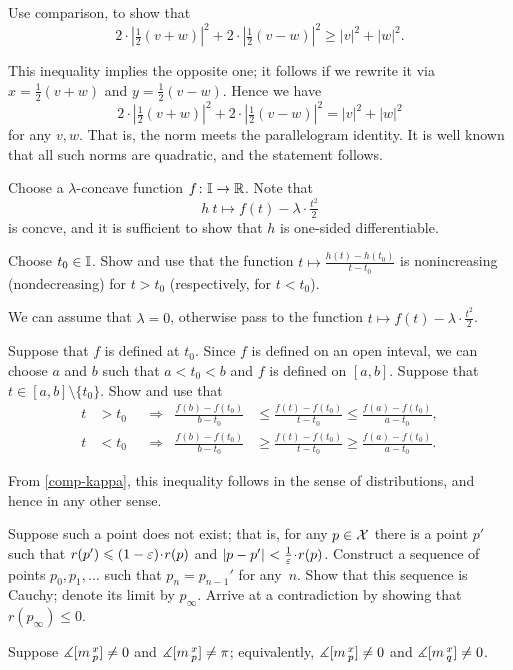 Use comparison, to show that
\[2\cdot |\tfrac12(v+w)|^2+2\cdot |\tfrac12(v-w)|^2\ge |v|^2+|w|^2.\]

This inequality implies the opposite one;
it follows if we rewrite it via $x=\tfrac12(v+w)$ and $y=\tfrac12(v-w)$.
Hence we have 
\[2\cdot |\tfrac12(v+w)|^2+2\cdot |\tfrac12(v-w)|^2= |v|^2+|w|^2\]
for any $v,w$.
That is, the norm meets the parallelogram identity.
It is well known that all such norms are quadratic, and the statement follows.

Choose a $\lambda$-concave function $f\colon\mathbb{I}\to\mathbb{R}$.
Note that
\[h\:t\mapsto f(t)-\lambda\cdot\tfrac{t^2}2\]
is concve,
and it is sufficient to show that $h$ is one-sided differentiable.

Choose $t_0\in \mathbb{I}$.
Show and use that the function
$t\mapsto \tfrac {h(t)-h(t_0)}{t-t_0}$ is nonincreasing (nondecreasing) for $t>t_0$ (respectively, for $t<t_0$).



We can assume that $\lambda=0$, otherwise pass to the function $t\mapsto f(t)-\lambda\cdot\tfrac{t^2}2$.

Suppose that $f$ is defined at $t_0$.
Since $f$ is defined on an open inteval, we can choose $a$ and $b$ such that $a<t_0<b$ and $f$ is defined on $[a,b]$.
Suppose that $t\in [a,b]\setminus\{t_0\}$.
Show and use that
\begin{align*}
t&>t_0
&&\Longrightarrow
&\frac{f(b)-f(t_0)}{b-t_0}&\le \frac{f(t)-f(t_0)}{t-t_0}\le \frac{f(a)-f(t_0)}{a-t_0},
\\
t&<t_0
&&\Longrightarrow
&\frac{f(b)-f(t_0)}{b-t_0}&\ge \frac{f(t)-f(t_0)}{t-t_0}\ge \frac{f(a)-f(t_0)}{a-t_0}.
\end{align*}



From \ref{comp-kappa}, this inequality follows in the sense of distributions, and hence in any other sense.

Suppose such a point does not exist;
that is, for any $p\in \mathcal{X}$ there is a point $p'$ such that $r(p')\le  (1-\eps)\cdot r(p)$ and $\dist p{p'}{}<\tfrac{1}{\eps}\cdot r(p)$.
Construct a sequence of points $p_0,p_1,\dots$ such that $p_n=p_{n-1}'$ for any~$n$.
Show that this sequence is Cauchy; denote its limit by $p_\infty$.
Arrive at a contradiction by showing that $r(p_\infty)\le0$.

Suppose $\measuredangle[m\,{}^{x}_{p}]\ne 0$ and $\measuredangle[m\,{}^{x}_{p}]\ne\pi$;
equivalently, $\measuredangle[m\,{}^{x}_{p}]\ne 0$ and $\measuredangle[m\,{}^{x}_{q}]\ne0$.

